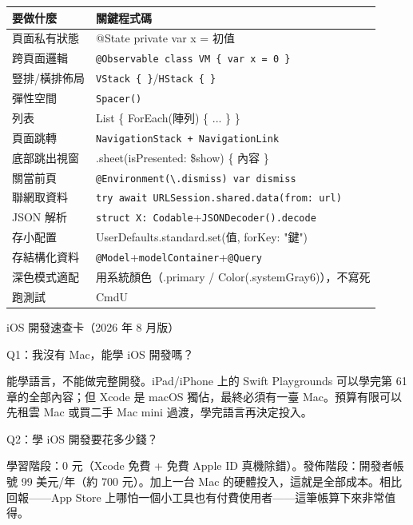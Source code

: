 


\begin{center}
\begin{tabularx}{\linewidth}{|X|X|}
\hline
\textbf{要做什麼} & \textbf{關鍵程式碼} \tabularnewline
\hline
頁面私有狀態 & @State private var x = 初值 \tabularnewline
跨頁面邏輯 & \texttt{@Observable class VM \{ var x = 0 \}} \tabularnewline
豎排/橫排佈局 & \texttt{VStack \{ \}}/\texttt{HStack \{ \}} \tabularnewline
彈性空間 & \texttt{Spacer()} \tabularnewline
列表 & List \{ ForEach(陣列) \{ ... \} \} \tabularnewline
頁面跳轉 & \texttt{NavigationStack + NavigationLink} \tabularnewline
底部跳出視窗 & .sheet(isPresented: \$show) \{ 內容 \} \tabularnewline
關當前頁 & \texttt{@Environment(\textbackslash{}.\allowbreak dismiss) var dismiss} \tabularnewline
聯網取資料 & \texttt{try await URLSession.\allowbreak shared.\allowbreak data(from: url)} \tabularnewline
JSON 解析 & \texttt{struct X: Codable}+\texttt{JSONDecoder().\allowbreak decode} \tabularnewline
存小配置 & UserDefaults.standard.set(值, forKey: "鍵") \tabularnewline
存結構化資料 & \texttt{@Model}+\texttt{modelContainer}+\texttt{@Query} \tabularnewline
深色模式適配 & 用系統顏色（.primary / Color(.systemGray6)），不寫死 \tabularnewline
跑測試 & CmdU \tabularnewline
\hline
\end{tabularx}
\end{center}

\begin{center}\small\color{gray}iOS 開發速查卡（2026 年 8 月版）\end{center}


Q1：我沒有 Mac，能學 iOS 開發嗎？

能學語言，不能做完整開發。iPad/iPhone 上的 Swift Playgrounds 可以學完第 61 章的全部內容；但 Xcode 是 macOS 獨佔，最終必須有一臺 Mac。預算有限可以先租雲 Mac 或買二手 Mac mini 過渡，學完語言再決定投入。

Q2：學 iOS 開發要花多少錢？

學習階段：0 元（Xcode 免費 + 免費 Apple ID 真機除錯）。發佈階段：開發者帳號 99 美元/年（約 700 元）。加上一台 Mac 的硬體投入，這就是全部成本。相比回報——App Store 上哪怕一個小工具也有付費使用者——這筆帳算下來非常值得。

